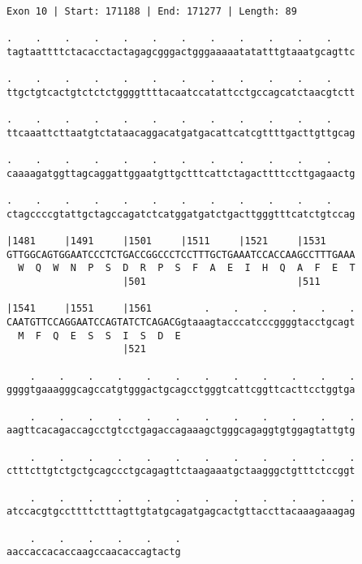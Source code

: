 \documentclass{article}
\begin{document}
\newpage
\begin{Verbatim}[fontfamily=courier]
Exon 10 | Start: 171188 | End: 171277 | Length: 89

.    .    .    .    .    .    .    .    .    .    .    .    
tagtaattttctacacctactagagcgggactgggaaaaatatatttgtaaatgcagttc

.    .    .    .    .    .    .    .    .    .    .    .    
ttgctgtcactgtctctctggggttttacaatccatattcctgccagcatctaacgtctt

.    .    .    .    .    .    .    .    .    .    .    .    
ttcaaattcttaatgtctataacaggacatgatgacattcatcgttttgacttgttgcag

.    .    .    .    .    .    .    .    .    .    .    .    
caaaagatggttagcaggattggaatgttgctttcattctagacttttccttgagaactg

.    .    .    .    .    .    .    .    .    .    .    .    
ctagccccgtattgctagccagatctcatggatgatctgacttgggtttcatctgtccag

|1481     |1491     |1501     |1511     |1521     |1531     
GTTGGCAGTGGAATCCCTCTGACCGGCCCTCCTTTGCTGAAATCCACCAAGCCTTTGAAA
  W  Q  W  N  P  S  D  R  P  S  F  A  E  I  H  Q  A  F  E  T
                    |501                          |511      

|1541     |1551     |1561         .    .    .    .    .    .
CAATGTTCCAGGAATCCAGTATCTCAGACGgtaaagtacccatcccggggtacctgcagt
  M  F  Q  E  S  S  I  S  D  E                              
                    |521                                    

    .    .    .    .    .    .    .    .    .    .    .    .
ggggtgaaagggcagccatgtgggactgcagcctgggtcattcggttcacttcctggtga

    .    .    .    .    .    .    .    .    .    .    .    .
aagttcacagaccagcctgtcctgagaccagaaagctgggcagaggtgtggagtattgtg

    .    .    .    .    .    .    .    .    .    .    .    .
ctttcttgtctgctgcagccctgcagagttctaagaaatgctaagggctgtttctccggt

    .    .    .    .    .    .    .    .    .    .    .    .
atccacgtgccttttctttagttgtatgcagatgagcactgttaccttacaaagaaagag

    .    .    .    .    .    .
aaccaccacaccaagccaacaccagtactg
\end{Verbatim}
\newpage
\end{document}
